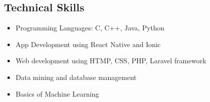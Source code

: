 \documentclass[margin]{res}
\begin{document}
\begin{resume}
\section{Technical Skills}
\begin{itemize}
  \item Programming Languages: C, C++, Java, Python
  \item App Development using React Native and Ionic
  \item Web development using HTMP, CSS, PHP, Laravel framework
  \item Data mining and database management
  \item Basics of Machine Learning
\end{itemize}

  
\end{resume}
\end{document}

